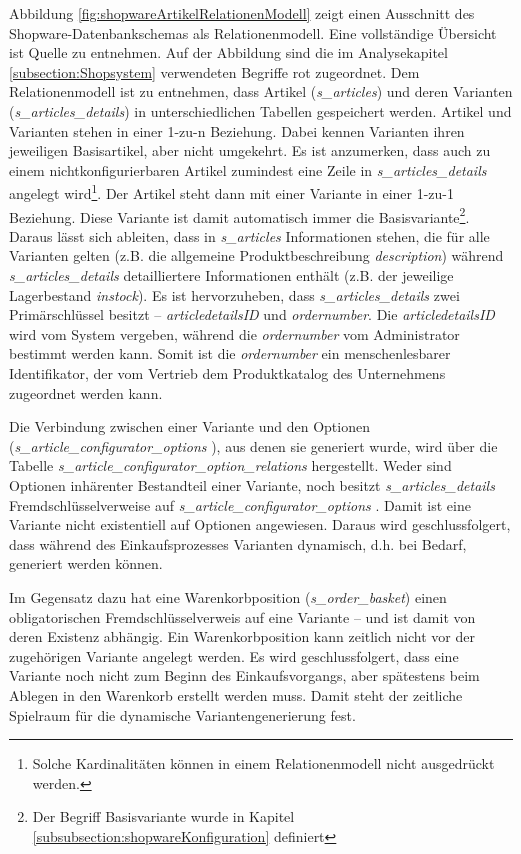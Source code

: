 \documentclass[12pt,a4paper,bibliography=totocnumbered,listof=totoc]{scrartcl}
\begin{document}
Abbildung \ref{fig:shopwareArtikelRelationenModell} zeigt einen Ausschnitt des Shopware-Datenbankschemas als Relationenmodell. Eine vollständige Übersicht ist Quelle \citet{shopwareDatabaseScheme} zu entnehmen. Auf der Abbildung sind die im Analysekapitel \ref{subsection:Shopsystem} verwendeten Begriffe rot zugeordnet. Dem Relationenmodell ist zu entnehmen, dass Artikel (\emph{s\_articles}) und deren Varianten (\emph{s\_articles\_details}) in unterschiedlichen Tabellen gespeichert werden. Artikel und Varianten stehen in einer 1-zu-n Beziehung. Dabei kennen Varianten ihren jeweiligen Basisartikel, aber nicht umgekehrt. Es ist anzumerken, dass auch zu einem nichtkonfigurierbaren Artikel zumindest eine Zeile in \emph{s\_articles\_details} angelegt wird\footnote{Solche Kardinalitäten können in einem Relationenmodell nicht ausgedrückt werden.}. Der Artikel steht dann mit einer Variante in einer 1-zu-1 Beziehung. Diese Variante ist damit automatisch immer die Basisvariante\footnote{Der Begriff Basisvariante wurde in Kapitel \ref{subsubsection:shopwareKonfiguration} definiert}. Daraus lässt sich ableiten, dass in \emph{s\_articles} Informationen stehen, die für alle Varianten gelten (z.B. die allgemeine Produktbeschreibung \emph{description}) während \emph{s\_articles\_details} detailliertere Informationen enthält (z.B. der jeweilige Lagerbestand \emph{instock}). Es ist hervorzuheben, dass \emph{s\_articles\_details} zwei Primärschlüssel besitzt -- \emph{articledetailsID} und \emph{ordernumber}. Die \emph{articledetailsID} wird vom System vergeben, während die \emph{ordernumber} vom Administrator bestimmt werden kann. Somit ist die \emph{ordernumber} ein menschenlesbarer Identifikator, der vom Vertrieb dem Produktkatalog des Unternehmens zugeordnet werden kann.

Die Verbindung zwischen einer Variante und den Optionen (\emph{s\_article\_configurator\_options }), aus denen sie generiert wurde, wird über die Tabelle \emph{s\_article\_configurator\_option\_relations} hergestellt. Weder sind Optionen inhärenter Bestandteil einer Variante, noch besitzt \emph{s\_articles\_details} Fremdschlüsselverweise auf \emph{s\_article\_configurator\_options }. Damit ist eine Variante nicht existentiell auf Optionen angewiesen. Daraus wird geschlussfolgert, dass während des Einkaufsprozesses Varianten dynamisch, d.h. bei Bedarf, generiert werden können.

Im Gegensatz dazu hat eine Warenkorbposition (\emph{s\_order\_basket}) einen obligatorischen Fremdschlüsselverweis auf eine Variante -- und ist damit von deren Existenz abhängig. Ein Warenkorbposition kann zeitlich nicht vor der zugehörigen Variante angelegt werden. Es wird geschlussfolgert, dass eine Variante noch nicht zum Beginn des Einkaufsvorgangs, aber spätestens beim Ablegen in den Warenkorb erstellt werden muss. Damit steht der zeitliche Spielraum für die dynamische Variantengenerierung fest.
\end{document}
